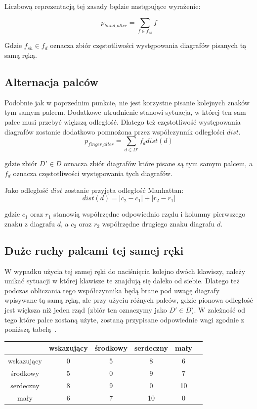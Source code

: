 \documentclass[brudnopis]{xmgr}
\begin{document}
Liczbową reprezentacją tej zasady będzie następujące wyrażenie:

$$ p_{hand\_alter} = \sum\limits_{f \in f_{sh}} f $$

Gdzie $ f_{sh} \in f_d $ oznacza zbiór częstotliwości występowania diagrafów pisanych tą samą ręką.


\subsection{Alternacja palców}

Podobnie jak w poprzednim punkcie, nie jest korzystne pisanie kolejnych znaków tym samym palcem. Dodatkowe utrudnienie stanowi sytuacja, w której ten sam palec musi przebyć większą odległość. Dlatego też częstotliwość występowania diagrafów zostanie dodatkowo pomnożona przez współczynnik odległości $dist$.
$$ p_{finger\_alter} = \sum\limits_{d \in D'} f_d dist(d) $$

\noindent
gdzie zbiór $ D' \in D $ oznacza zbiór diagrafów które pisane są tym samym palcem, a $f_d$ oznacza częstotliwości występowania tych diagrafów.\newline

Jako odległość $dist$ zostanie przyjęta odległość Manhattan:
$$ dist(d) = |c_2 - c_1| + |r_2 - r_1| $$

gdzie $c_1$ oraz $r_1$ stanowią współrzędne odpowiednio rzędu i kolumny pierwszego znaku z diagrafu $d$, a $c_2$ oraz $r_2$ współrzędne drugiego znaku diagrafu $d$.


\subsection{Duże ruchy palcami tej samej ręki}

W wypadku użycia tej samej ręki do naciśnięcia kolejno dwóch klawiszy, należy unikać sytuacji w której klawisze te znajdują się daleko od siebie. Dlatego też podczas obliczania tego współczynnika będą brane pod uwagę diagrafy wpisywane tą samą ręką, ale przy użyciu różnych palców, gdzie pionowa odległość jest większa niż jeden rząd (zbiór ten oznaczymy jako $ D' \in D $). W zależność od tego które palce zostaną użyte, zostaną przypisane odpowiednie wagi zgodnie z poniższą tabelą~\cite{Eggers2003672}.\newline

\begin{tabular}{ c | c | c | c | c | c }
  & wskazujący & środkowy & serdeczny & mały \\
  \hline
  wskazujący & 0 & 5 & 8 & 6 \\
  środkowy & 5 & 0 & 9 & 7 \\
  serdeczny & 8 & 9 & 0 & 10 \\
  mały & 6 & 7 & 10 & 0 \\
\end{tabular}\newline\newline
\end{document}

